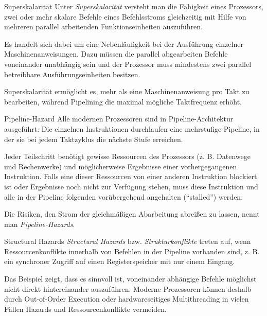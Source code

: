 \begin{defi}{Superskalarität}
    Unter \emph{Superskalarität} versteht man die Fähigkeit eines Prozessors, zwei oder mehr skalare Befehle eines Befehlsstroms gleichzeitig mit Hilfe von mehreren parallel arbeitenden Funktionseinheiten auszuführen.
    
    Es handelt sich dabei um eine Nebenläufigkeit bei der Ausführung einzelner Maschinenanweisungen.
    Dazu müssen die parallel abgearbeiten Befehle voneinander unabhängig sein und der Prozessor muss mindestens zwei parallel betreibbare Ausführungseinheiten besitzen.
    
    Superskalarität ermöglicht es, mehr als eine Maschinenanweisung pro Takt zu bearbeiten, während Pipelining die maximal mögliche Taktfrequenz erhöht.
\end{defi}

\begin{defi}{Pipeline-Hazard}
    Alle modernen Prozessoren sind in Pipeline-Architektur ausgeführt:
    Die einzelnen Instruktionen durchlaufen eine mehrstufige Pipeline, in der sie bei jedem Taktzyklus die nächste Stufe erreichen.
    
    Jeder Teilschritt benötigt gewisse Ressourcen des Prozessors (z. B. Datenwege und Rechenwerke) und möglicherweise Ergebnisse einer vorhergegangenen Instruktion.
    Falls eine dieser Ressourcen von einer anderen Instruktion blockiert ist oder Ergebnisse noch nicht zur Verfügung stehen, muss diese Instruktion und alle in der Pipeline folgenden vorübergehend angehalten (\enquote{stalled}) werden.
    
    Die Risiken, den Strom der gleichmäßigen Abarbeitung abreißen zu lassen, nennt man \emph{Pipeline-Hazards}.
\end{defi}

\begin{defi}{Structural Hazards}
    \emph{Structural Hazards} bzw. \emph{Strukturkonflikte} treten auf, wenn Ressourcenkonflikte innerhalb von Befehlen in der Pipeline vorhanden sind, z. B. ein synchroner Zugriff auf einen Registerspeicher mit nur einem Eingang.
    
    Das Beispiel zeigt, dass es sinnvoll ist, voneinander abhängige Befehle möglichst nicht direkt hintereinander auszuführen.
    Moderne Prozessoren können deshalb durch Out-of-Order Execution oder hardwareseitiges Multithreading in vielen Fällen Hazards und Ressourcenkonflikte vermeiden.
\end{defi}

